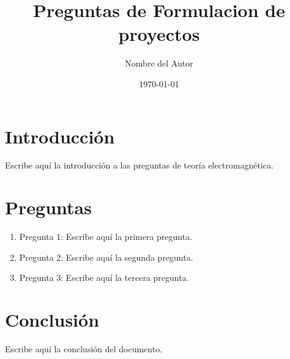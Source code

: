 \documentclass[12pt]{article}
\title{Preguntas de Formulacion de proyectos}
\author{Nombre del Autor}
\date{\today}
\begin{document}
\maketitle

\section{Introducción}
Escribe aquí la introducción a las preguntas de teoría electromagnética.

\section{Preguntas}
\begin{enumerate}
    \item Pregunta 1: Escribe aquí la primera pregunta.
    \item Pregunta 2: Escribe aquí la segunda pregunta.
    \item Pregunta 3: Escribe aquí la tercera pregunta.
\end{enumerate}

\section{Conclusión}
Escribe aquí la conclusión del documento.
\end{document}

